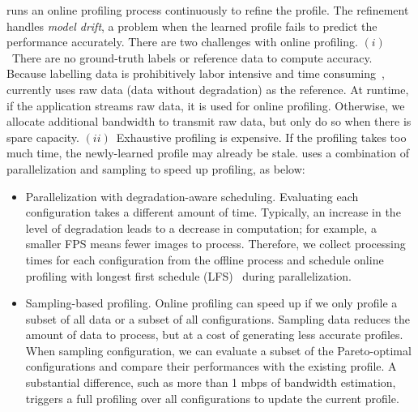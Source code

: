 
 \sysname{} runs an online profiling process
continuously to refine the profile. The refinement handles \textit{model drift},
a problem when the learned profile fails to predict the performance
accurately. There are two challenges with online profiling.  $(i)$~There are no
ground-truth labels or reference data to compute accuracy. Because labelling
data is prohibitively labor intensive and time
consuming~\cite{russell2008labelme}, \sysname{} currently uses raw data (data
without degradation) as the reference. At runtime, if the application streams
raw data, it is used for online profiling. Otherwise, we allocate additional
bandwidth to transmit raw data, but only do so when there is spare
capacity. $(ii)$~Exhaustive profiling is expensive. If the profiling takes too
much time, the newly-learned profile may already be stale. \sysname{} uses a
combination of parallelization and sampling to speed up profiling, as below:

\begin{itemize}[leftmargin=*, topsep=0pt, itemsep=0pt]

\item Parallelization with degradation-aware scheduling. Evaluating each
  configuration takes a different amount of time. Typically, an increase in the
  level of degradation leads to a decrease in computation; for example, a
  smaller FPS means fewer images to process. Therefore, we collect processing
  times for each configuration from the offline process and schedule online
  profiling with longest first schedule (LFS)~\cite{karger2010scheduling} during
  parallelization.

\item Sampling-based profiling. Online profiling can speed up if we only profile
  a subset of all data or a subset of all configurations.  Sampling data reduces
  the amount of data to process, but at a cost of generating less accurate
  profiles. When sampling configuration, we can evaluate a subset of the
  Pareto-optimal configurations and compare their performances with the existing
  profile. A substantial difference, such as more than 1 mbps of bandwidth
  estimation, triggers a full profiling over all configurations to update the
  current profile.

\end{itemize}

